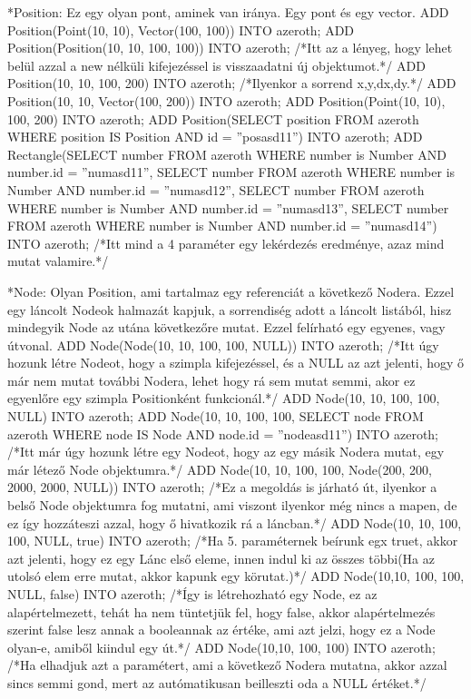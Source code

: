 *Position: Ez egy olyan pont, aminek van iránya. Egy pont és egy vector.
ADD Position(Point(10, 10),  Vector(100, 100)) INTO azeroth;
ADD Position(Position(10, 10, 100, 100)) INTO azeroth; /*Itt az a lényeg, hogy lehet belül azzal a new nélküli kifejezéssel is visszaadatni új objektumot.*/
ADD Position(10, 10, 100, 200) INTO azeroth; /*Ilyenkor a sorrend x,y,dx,dy.*/
ADD Position(10, 10, Vector(100, 200)) INTO azeroth;
ADD Position(Point(10, 10), 100, 200) INTO azeroth;
ADD Position(SELECT position FROM azeroth WHERE position IS Position AND id = ”posasd11”) INTO azeroth;
ADD Rectangle(SELECT number FROM azeroth WHERE number is Number AND number.id = ”numasd11”, SELECT number FROM azeroth WHERE number is Number AND number.id = ”numasd12”, SELECT number FROM azeroth WHERE number is Number AND number.id = ”numasd13”, SELECT number FROM azeroth WHERE number is Number AND number.id = ”numasd14”) INTO azeroth;  /*Itt mind a 4 paraméter egy lekérdezés eredménye, azaz mind mutat valamire.*/


*Node: Olyan Position, ami tartalmaz egy referenciát a következő Nodera. Ezzel egy láncolt Nodeok halmazát kapjuk, a sorrendiség adott a láncolt listából, hisz mindegyik Node az utána következőre mutat. Ezzel felírható egy egyenes, vagy útvonal. 
ADD Node(Node(10, 10, 100, 100, NULL)) INTO azeroth; /*Itt úgy hozunk létre Nodeot, hogy a szimpla kifejezéssel, és a NULL az azt jelenti, hogy ő már nem mutat további Nodera, lehet hogy rá sem mutat semmi, akor ez egyenlőre egy szimpla Positionként funkcionál.*/
ADD Node(10, 10, 100, 100, NULL) INTO azeroth;
ADD Node(10, 10, 100, 100, SELECT node FROM azeroth WHERE node IS Node AND node.id = ”nodeasd11”) INTO azeroth; /*Itt már úgy hozunk létre egy Nodeot, hogy az egy másik Nodera mutat, egy már létező Node objektumra.*/
ADD Node(10, 10, 100, 100, Node(200, 200, 2000, 2000, NULL)) INTO azeroth; /*Ez a megoldás is járható út, ilyenkor a belső Node objektumra fog mutatni, ami viszont ilyenkor még nincs a mapen, de ez így hozzáteszi azzal, hogy ő hivatkozik rá a láncban.*/
ADD Node(10, 10, 100, 100, NULL, true) INTO azeroth; /*Ha 5. paraméternek beírunk egx truet, akkor azt jelenti, hogy ez egy Lánc első eleme, innen indul ki az összes többi(Ha az utolsó elem erre mutat, akkor kapunk egy körutat.)*/
ADD Node(10,10, 100, 100, NULL, false) INTO azeroth; /*Így is létrehozható egy Node, ez az alapértelmezett, tehát ha nem tüntetjük fel, hogy false, akkor alapértelmezés szerint false lesz annak a booleannak az értéke, ami azt jelzi, hogy ez a Node olyan-e, amiből kiindul egy út.*/
ADD Node(10,10, 100, 100) INTO azeroth; /*Ha elhadjuk azt a paramétert, ami a következő Nodera mutatna, akkor azzal sincs semmi gond, mert az autómatikusan beilleszti oda a NULL értéket.*/


